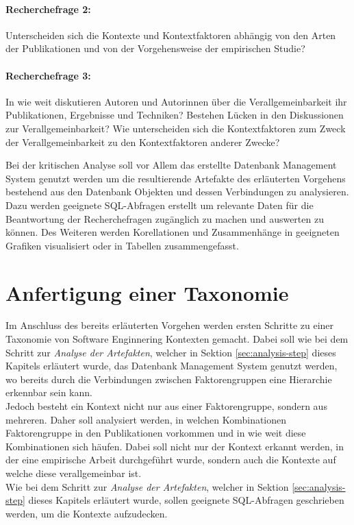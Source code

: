 \paragraph{Recherchefrage 2:} Unterscheiden sich die Kontexte und Kontextfaktoren abhängig von den Arten der Publikationen und von der Vorgehensweise der empirischen Studie?

\paragraph{Recherchefrage 3:} In wie weit diskutieren Autoren und Autorinnen über die Verallgemeinbarkeit ihr Publikationen, Ergebnisse und Techniken? Bestehen Lücken in den Diskussionen zur Verallgemeinbarkeit? Wie unterscheiden sich die Kontextfaktoren zum Zweck der Verallgemeinbarkeit zu den Kontextfaktoren anderer Zwecke?

Bei der kritischen Analyse soll vor Allem das erstellte Datenbank Management System genutzt werden um die resultierende Artefakte des erläuterten Vorgehens bestehend aus den Datenbank Objekten und dessen Verbindungen zu analysieren. Dazu werden geeignete SQL-Abfragen erstellt um relevante Daten für die Beantwortung der Recherchefragen zugänglich zu machen und auswerten zu können. Des Weiteren werden Korellationen und Zusammenhänge in geeigneten Grafiken visualisiert oder in Tabellen zusammengefasst.


\section{Anfertigung einer Taxonomie}
Im Anschluss des bereits erläuterten Vorgehen werden ersten Schritte zu einer Taxonomie von Software Enginnering Kontexten gemacht. Dabei soll wie bei dem Schritt zur \textit{Analyse der Artefakten}, welcher in Sektion \ref{sec:analysis-step} dieses Kapitels erläutert wurde, das Datenbank Management System genutzt werden, wo bereits durch die Verbindungen zwischen Faktorengruppen eine Hierarchie erkennbar sein kann. \\

Jedoch besteht ein Kontext nicht nur aus einer Faktorengruppe, sondern aus mehreren. Daher soll analysiert werden, in welchen Kombinationen Faktorengruppe in den Publikationen vorkommen und in wie weit diese Kombinationen sich häufen. Dabei soll nicht nur der Kontext erkannt werden, in der eine empirische Arbeit durchgeführt wurde, sondern auch die Kontexte auf welche diese verallgemeinbar ist. \\
Wie bei dem Schritt zur \textit{Analyse der Artefakten}, welcher in Sektion \ref{sec:analysis-step} dieses Kapitels erläutert wurde, sollen geeignete SQL-Abfragen geschrieben werden, um die Kontexte aufzudecken.

